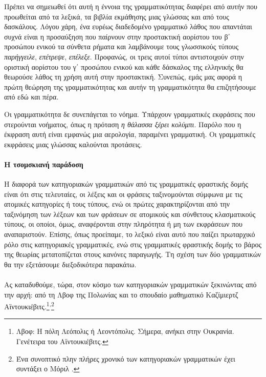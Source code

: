 \documentclass [a4paper,11pt] {book}
\theoremstyle{definition}
\theoremstyle{definition}
\begin{document}
Πρέπει να σημειωθεί ότι αυτή η έννοια της γραμματικότητας διαφέρει από αυτήν που προωθείται από τα λεξικά, τα βιβλία εκμάθησης μιας γλώσσας και από τους δασκάλους. Λόγου χάρη, ένα ευρέως διαδεδομένο γραμματικό λάθος που απαντάται συχνά είναι η προσαύξηση που παίρνουν στην προστακτική αορίστου του β΄ προσώπου ενικού τα σύνθετα ρήματα και λαμβάνουμε τους γλωσσικούς τύπους \textit{παρήγγειλε}, \textit{επέτρεψε}, \textit{επέλεξε}. Προφανώς, οι τρεις αυτοί τύποι αντιστοιχούν στην οριστική αορίστου του γ΄ προσώπου ενικού και κάθε δάσκαλος της ελληνικής θα θεωρούσε λάθος τη χρήση αυτή στην προστακτική.
Συνεπώς, εμάς μας αφορά η πρώτη θεώρηση της γραμματικότητας και αυτήν τη γραμματικότητα θα επιζητήσουμε από εδώ και πέρα.

Οι γραμματικότητα δε συνεπάγεται το νόημα. Υπάρχουν γραμματικές εκφράσεις που στερούνται νοήματος, όπως η πρόταση \textit{η θάλασσα ξέρει κολύμπι}. Παρόλο που η έκφραση αυτή είναι εμφανώς μια αερολογία, παραμένει γραμματική. Οι γραμματικές εκφράσεις μιας γλώσσας καλούνται προτάσεις.
\paragraph{Η τσομσκιανή παράδοση}
Η διαφορά των κατηγοριακών γραμματικών από τις γραμματικές φραστικής δομής είναι ότι στις τελευταίες, οι λέξεις και οι φράσεις ταξινομούνται σύμφωνα με τις ατομικές κατηγορίες ή τους τύπους, ενώ οι πρώτες χαρακτηρίζονται από την ταξινόμηση των λέξεων και των φράσεων σε ατομικούς και σύνθετους κλασματικούς τύπους, οι οποίοι, όμως, αναφέρονται στην πληρότητα ή μη των εκφράσεων που αναπαριστούν. Επίσης, όπως προείπαμε, το λεξικό είναι αυτό που παίζει πρωταρχικό ρόλο στις κατηγοριακές γραμματικές, ενώ στις γραμματικές φραστικής δομής το βάρος της θεωρίας μετατοπίζεται στους κανόνες παραγωγής. Τη σχέση των δύο γραμματικών θα την εξετάσουμε διεξοδικότερα παρακάτω.
\paragraph{}
Ας καταδυθούμε, τώρα, στον κόσμο των κατηγοριακών γραμματικών ξεκινώντας από την αρχή: από τη Λβοφ της Πολωνίας και το σπουδαίο μαθηματικό Καζίμιερτζ Αϊντουκιέβιτς.\footnote{Λβοφ: Η πόλη Λεόπολις ή Λεοντόπολις. Σήμερα, ανήκει στην Ουκρανία. Γενέτειρα του Αϊντουκιέβιτς.}\textsuperscript{,}\footnote{Ένα συνοπτικό πλην πλήρες χρονικό των κατηγοριακών γραμματικών έχει συντάξει ο Μόριλ \citep{history}.}
\end{document}
